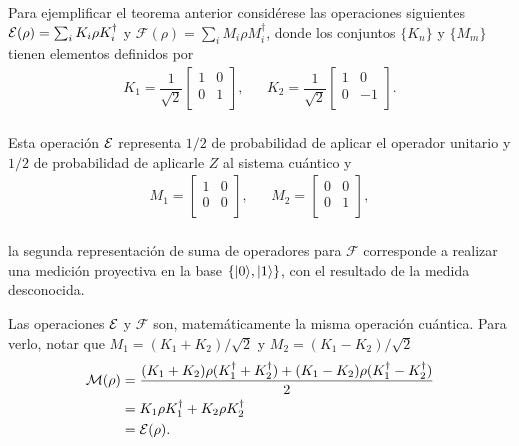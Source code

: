 Para ejemplificar el teorema anterior  considérese las operaciones siguientes $\mathcal{E}(\rho)=\sum_i K_i\rho K_i^\dagger$ y $\mathcal{F}(\rho)=\sum_i M_i\rho M_i^\dagger$, donde los conjuntos $\{K_n\}$ y $\{M_m\}$ tienen elementos definidos por 
\begin{equation}
    \begin{array}{ccc}
        K_1=\dfrac{1}{\sqrt{2}}\begin{bmatrix}
            1&0\\
            0&1\\
        \end{bmatrix},&&K_2=\dfrac{1}{\sqrt{2}}\begin{bmatrix}
            1&0\\
            0&-1\\
        \end{bmatrix}.\\
    \end{array}
\end{equation}

Esta operación $\mathcal{E}$ representa $1/2$ de probabilidad de aplicar el operador unitario y $1/2$ de probabilidad de aplicarle $Z$ al sistema cuántico y
\begin{equation}
    \begin{array}{ccc}
        M_1=\begin{bmatrix}
            1&0\\
            0&0\\
        \end{bmatrix},&&M_2=\begin{bmatrix}
            0&0\\
            0&1\\
        \end{bmatrix},\\
    \end{array}
\end{equation}

la segunda representación de suma de operadores para $\mathcal{F}$ corresponde a realizar una medición proyectiva en la base $\{|0\rangle , |1\rangle\}$, con el resultado de la medida desconocida. 



Las operaciones $\mathcal{E}$ y $\mathcal{F}$ son, matemáticamente la misma operación cuántica. Para verlo, notar que $M_1=(K_1+K_2)/\sqrt{2}$ y $M_2=(K_1-K_2)/\sqrt{2}$
\begin{equation}
    \begin{split}
        \mathcal{M}(\rho)&=\dfrac{(K_1+K_2)\rho(K_1^\dagger+K_2^\dagger)+(K_1-K_2)\rho(K_1^\dagger-K_2^\dagger)}{2}\\
        &=K_1\rho K_1^\dagger+K_2\rho K_2^\dagger\\
        &=\mathcal{E}(\rho).
    \end{split}
\end{equation}
